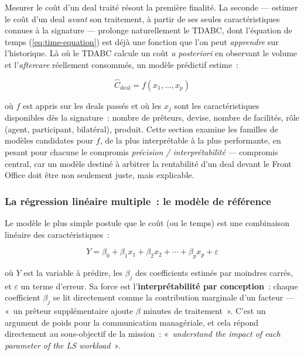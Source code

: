 Mesurer le coût d'un deal traité résout la première finalité. La seconde --- estimer le
coût d'un deal \emph{avant} son traitement, à partir de ses seules caractéristiques
connues à la signature --- prolonge naturellement le TDABC, dont l'équation de temps
(\ref{eq:time-equation}) est déjà une fonction que l'on peut \emph{apprendre} sur
l'historique. Là où le TDABC calcule un coût \textit{a posteriori} en observant le
volume et l'\textit{aftercare} réellement consommés, un modèle prédictif estime~:

\begin{equation}
\hat{C}_{\text{deal}} = f\!\left(x_1, \dots, x_p\right)
\label{eq:cout-predit}
\end{equation}

\noindent où $f$ est appris sur les deals passés et où les $x_j$ sont les
caractéristiques disponibles dès la signature~: nombre de prêteurs, devise, nombre de
facilités, rôle (agent, participant, bilatéral), produit. Cette section examine les
familles de modèles candidates pour $f$, de la plus interprétable à la plus performante,
en pesant pour chacune le compromis \emph{précision / interprétabilité} --- compromis
central, car un modèle destiné à arbitrer la rentabilité d'un deal devant le Front Office
doit être non seulement juste, mais explicable.

\subsubsection{La régression linéaire multiple~: le modèle de référence}

Le modèle le plus simple postule que le coût (ou le temps) est une combinaison linéaire
des caractéristiques~:

\begin{equation}
Y = \beta_0 + \beta_1 x_1 + \beta_2 x_2 + \cdots + \beta_p x_p + \varepsilon
\label{eq:regression}
\end{equation}

\noindent où $Y$ est la variable à prédire, les $\beta_j$ des coefficients estimés par
moindres carrés, et $\varepsilon$ un terme d'erreur. Sa force est l'\textbf{interprétabilité
par conception}~: chaque coefficient $\beta_j$ se lit directement comme la contribution
marginale d'un facteur --- «~un prêteur supplémentaire ajoute $\beta$ minutes de
traitement~». C'est un argument de poids pour la communication managériale, et cela
répond directement au sous-objectif de la mission~: «~\textit{understand the impact of
each parameter of the LS workload}~».

